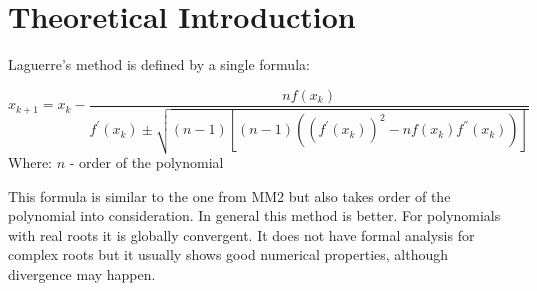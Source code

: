\section{Theoretical Introduction}
Laguerre's method is defined by a single formula:

\[ x_{k+1} = x_k - \frac{nf(x_k)}{f^{'}(x_k) \pm \sqrt{(n-1)[(n-1)( (f^{'}(x_k))^2 - nf(x_k)f^{''}(x_k) )]}} \]
Where:
$n$ - order of the polynomial

This formula is similar to the one from MM2 but also takes order of the polynomial into consideration. In general this method is better. For polynomials with real roots it is globally convergent. It does not have formal analysis for complex roots but it usually shows good numerical properties, although divergence may happen.

